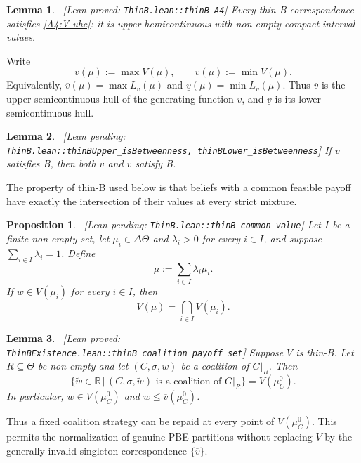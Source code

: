 \documentclass[11pt]{article}
\newtheorem{proposition}{Proposition}
\newtheorem{lemma}{Lemma}
\newcommand{\sep}{\,|\,}
\newcommand{\leanproved}[1]{{\footnotesize\textsf{\textcolor{green!55!black}{[Lean proved: \texttt{#1}]}}}}
\newcommand{\leanpending}[1]{{\footnotesize\textsf{\textcolor{orange!80!black}{[Lean pending: \texttt{#1}]}}}}
\begin{document}
\begin{lemma}\label{lem:thinB-A4}\ \leanproved{ThinB.lean::thinB\_A4}
    Every thin-B correspondence satisfies \cref{A4:V-uhc}: it is upper hemicontinuous with non-empty compact interval values.
\end{lemma}

Write
\[
    \overline v(\mu):=\max V(\mu),
    \qquad
    \underline v(\mu):=\min V(\mu).
\]
Equivalently, $\overline v(\mu)=\max L_v(\mu)$ and $\underline v(\mu)=\min L_v(\mu)$. Thus $\overline v$ is the upper-semicontinuous hull of the generating function $v$, and $\underline v$ is its lower-semicontinuous hull.

\begin{lemma}\label{lem:thinB-envelope-B}\ \leanpending{ThinB.lean::thinBUpper\_isBetweenness,\ thinBLower\_isBetweenness}
    If $v$ satisfies B, then both $\overline v$ and $\underline v$ satisfy B.
\end{lemma}

The property of thin-B used below is that beliefs with a common feasible payoff have exactly the intersection of their values at every strict mixture.

\begin{proposition}\label{prop:thinB-common-value}\ \leanpending{ThinB.lean::thinB\_common\_value}
    Let $I$ be a finite non-empty set, let $\mu_i\in\Delta\Theta$ and $\lambda_i>0$ for every $i\in I$, and suppose $\sum_{i\in I}\lambda_i=1$. Define
    \[
        \mu:=\sum_{i\in I}\lambda_i\mu_i.
    \]
    If $w\in V(\mu_i)$ for every $i\in I$, then
    \[
        V(\mu)=\bigcap_{i\in I}V(\mu_i).
    \]
\end{proposition}

\begin{lemma}\label{lem:thinB-value-set}\ \leanproved{ThinBExistence.lean::thinB\_coalition\_payoff\_set}
    Suppose $V$ is thin-B. Let $R\subseteq\Theta$ be non-empty and let $(C,\sigma,w)$ be a coalition of $G\vert_R$. Then
    \[
        \bigl\{\widetilde w\in\mathbb{R}
        \sep
        (C,\sigma,\widetilde w)\text{ is a coalition of }G\vert_R
        \bigr\}
        =
        V(\mu^0_C).
    \]
    In particular, $w\in V(\mu^0_C)$ and $w\leq\overline v(\mu^0_C)$.
\end{lemma}

Thus a fixed coalition strategy can be repaid at every point of $V(\mu^0_C)$. This permits the normalization of genuine PBE partitions without replacing $V$ by the generally invalid singleton correspondence $\{\overline v\}$.
\end{document}
